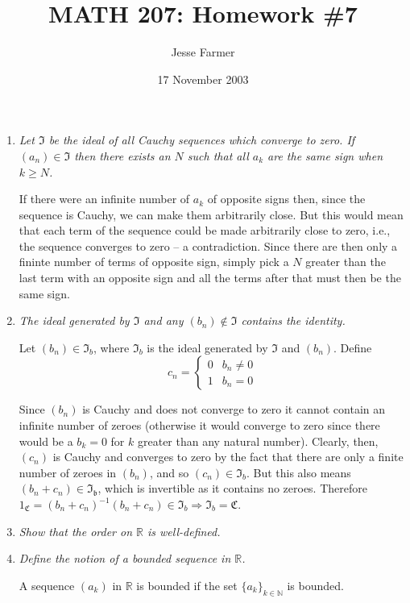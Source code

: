 \documentclass[11pt]{article}
\title{MATH 207: Homework \#7}
\author{Jesse Farmer}
\date{17 November 2003}
\begin{document}
\maketitle
\begin{enumerate}
\item \emph{Let $\mathfrak{I}$ be the ideal of all Cauchy sequences which converge to zero. If $(a_n) \in \mathfrak{I}$ then there exists an $N$ such that all $a_k$ are the same sign when $k \geq N$.}

If there were an infinite number of $a_k$ of opposite signs then, since the sequence is Cauchy, we can make them arbitrarily close.  But this would mean that each term of the sequence could be made arbitrarily close to zero, i.e., the sequence converges to zero -- a contradiction.  Since there are then only a fininte number of terms of opposite sign, simply pick a $N$ greater than the last term with an opposite sign and all the terms after that must then be the same sign.

\item \emph{The ideal generated by $\mathfrak{I}$ and any $(b_n) \notin \mathfrak{I}$ contains the identity.}

Let $(b_n) \in \mathfrak{I}_b$, where $\mathfrak{I}_b$ is the ideal generated by $\mathfrak{I}$ and $(b_n)$.  Define
 \[ c_n = \left\{
              \begin{array}{ll}
                   0 & b_n \neq 0\\
                   1 & b_n = 0
              \end{array}
       \right.
\]

Since $(b_n)$ is Cauchy and does not converge to zero it cannot contain an infinite number of zeroes (otherwise it would converge to zero since there would be a $b_k = 0$ for $k$ greater than any natural number).  Clearly, then, $(c_n)$ is Cauchy and converges to zero by the fact that there are only a finite number of zeroes in $(b_n)$, and so $(c_n) \in \mathfrak{I}_b$.  But this also means $(b_n + c_n) \in \mathfrak{I_b}$, which is invertible as it contains no zeroes.  Therefore $1_\mathfrak{C} = (b_n + c_n)^{-1}(b_n + c_n) \in \mathfrak{I}_b \Rightarrow \mathfrak{I}_b = \mathfrak{C}$.

\item \emph{Show that the order on $\mathbb{R}$ is well-defined.}

\item \emph{Define the notion of a bounded sequence in $\mathbb{R}$.}

A sequence $(a_k)$ in $\mathbb{R}$ is bounded if the set $\{a_k\}_{k \in \mathbb{N}}$ is bounded.


\end{enumerate}
\end{document}
